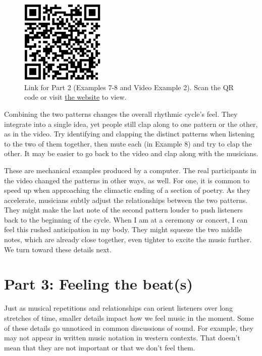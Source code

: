 \documentclass[twoside]{article}
\providecommand{\wmturlcaption}{
  Scan the QR code or visit \href{https://worldmusictextbook.org/witulski-2021}{the website} to view.
}
\begin{document}
\begin{figure}
  \centering
  \includegraphics[height=4cm]{witulski-rhythm-part-2.png}
  \caption*{Link for Part 2 (Examples 7-8 and Video Example 2). \wmturlcaption}
\end{figure}

Combining the two patterns changes the overall rhythmic cycle's feel.
They integrate into a single idea, yet people still clap along to one
pattern or the other, as in the video. Try identifying and clapping the
distinct patterns when listening to the two of them together, then mute
each (in Example 8) and try to clap the other. It may be easier to go back to the video
and clap along with the musicians.

These are mechanical examples produced by a computer. The real
participants in the video changed the patterns in other ways, as well.
For one, it is common to speed up when approaching the climactic ending
of a section of poetry. As they accelerate, musicians subtly adjust the
relationships between the two patterns. They might make the last note of
the second pattern louder to push listeners back to the beginning of the
cycle. When I am at a ceremony or concert, I can feel this rushed
anticipation in my body. They might squeeze the two middle notes, which
are already close together, even tighter to excite the music further. We
turn toward these details next.

\hypertarget{part-3-feeling-the-beats}{%
\section*{Part 3: Feeling the
beat(s)}\label{part-3-feeling-the-beats}}

Just as musical repetitions and relationships can orient listeners over
long stretches of time, smaller details impact how we feel music in the
moment. Some of these details go unnoticed in common discussions of
sound. For example, they may not appear in written music notation in
western contexts. That doesn't mean that they are not important or that
we don't feel them.
\end{document}

